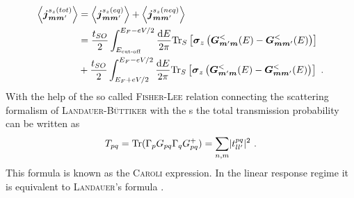 \begin{align}
\left< \boldsymbol{j}_{\boldsymbol{m}\boldsymbol{m}'}^{s_z(tot)} \right> &=\left< \boldsymbol{j}_{\boldsymbol{m}\boldsymbol{m}'}^{s_z(eq)} \right>+ \left< \boldsymbol{j}_{\boldsymbol{m}\boldsymbol{m}'}^{s_z(neq)} \right>\\
	&=\frac{t_{SO}}{2} \int_{E_{\text{cut-off}}}^{E_F-eV/2} \frac{\text{d}E}{2 \pi} \text{Tr}_S \left[\boldsymbol{\sigma}_z\left(\boldsymbol{G}^<_{\boldsymbol{m}'\boldsymbol{m}}(E)- \boldsymbol{G}^<_{\boldsymbol{m}\boldsymbol{m}'}(E)\right)\right]\\
	&+\frac{t_{SO}}{2} \int_{E_F+eV/2}^{E_F-eV/2} \frac{\text{d}E}{2 \pi} \text{Tr}_S \left[\boldsymbol{\sigma}_z\left(\boldsymbol{G}^<_{\boldsymbol{m}'\boldsymbol{m}}(E)- \boldsymbol{G}^<_{\boldsymbol{m}\boldsymbol{m}'}(E)\right)\right] \ .
	\label{eqn:gfnccurrent}
\end{align}
With the help of the so called \textsc{Fisher-Lee} relation \cite{PhysRevB.23.6851} connecting the scattering formalism of \textsc{Landauer-B\"uttiker} with the \gfnc s the total transmission probability can be written as
\begin{align}
T_{pq} = \text{Tr}(\Gamma_p G_{pq} \Gamma_q G^+_{pq}) = \sum_{n,m} \lvert t^{pq}_{ll'}\rvert^2\ .
\label{eqn:transmissionfunction}
\end{align}
This formula is known as the \textsc{Caroli} expression. In the linear response regime it is equivalent to \textsc{Landauer}'s formula \cite{PhysRevB.72.035450}.
